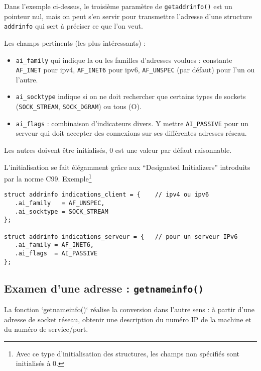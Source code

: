 Dans l'exemple ci-dessus, le troisième paramètre de \texttt{getaddrinfo()}
est un pointeur nul, mais on peut s'en servir pour transmettre
l'adresse d'une structure \texttt{addrinfo} qui sert à préciser ce que l'on
veut.

Les champs pertinents (les plus intéressants) :

\begin{itemize}
\item \texttt{ai\_family} qui indique la ou les familles d'adresses
  voulues : constante \texttt{AF\_INET} pour ipv4, \texttt{AF\_INET6}
  pour ipv6, \texttt{AF\_UNSPEC} (par défaut) pour l'un ou l'autre.

\item \texttt{ai\_socktype} indique si on ne doit rechercher que certains
types de sockets (\texttt{SOCK\_STREAM}, \texttt{SOCK\_DGRAM}) ou tous (O).

\item \texttt{ai\_flags} : combinaison d'indicateurs divers. Y mettre
  \texttt{AI\_PASSIVE} pour un serveur qui doit accepter des
  connexions sur ses différentes adresses réseau.
\end{itemize}

Les autres doivent être initialisés, 0 est une valeur par défaut
raisonnable.

L'initialisation se fait élégamment grâce aux ``Designated
Initializers'' introduits par la norme C99. Exemple\footnote{
  Avec ce type d'initialisation des structures, les champs
  non spécifiés sont initialisés à 0.}

\begin{lstlisting}
struct addrinfo indications_client = {    // ipv4 ou ipv6
   .ai_family   = AF_UNSPEC,
   .ai_socktype = SOCK_STREAM
};
   
struct addrinfo indications_serveur = {   // pour un serveur IPv6
   .ai_family = AF_INET6,
   .ai_flags  = AI_PASSIVE
};
\end{lstlisting}



\subsection{Examen d'une adresse : \texttt{getnameinfo()}}
  
La fonction `getnameinfo()` réalise la conversion dans l'autre sens :
à partir d'une adresse de socket réseau, obtenir une description du
numéro IP de la machine et du numéro de service/port.

